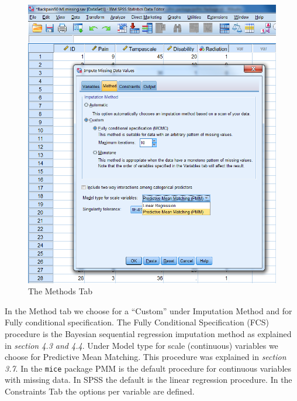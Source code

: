 \documentclass[]{book}
\begin{document}
\begin{figure}

{\centering \includegraphics[width=0.9\linewidth]{images/fig4.7} 

}

\caption{The Methods Tab}\label{fig:fig4-7}
\end{figure}

In the Method tab we choose for a ``Custom'' under Imputation Method and
for Fully conditional specification. The Fully Conditional Specification
(FCS) procedure is the Bayesian sequential regression imputation method
as explained in \emph{section 4.3 and 4.4}. Under Model type for scale
(continuous) variables we choose for Predictive Mean Matching. This
procedure was explained in \emph{section 3.7}. In the \texttt{mice}
package PMM is the default procedure for continuous variables with
missing data. In SPSS the default is the linear regression procedure. In
the Constraints Tab the options per variable are defined.
\end{document}
